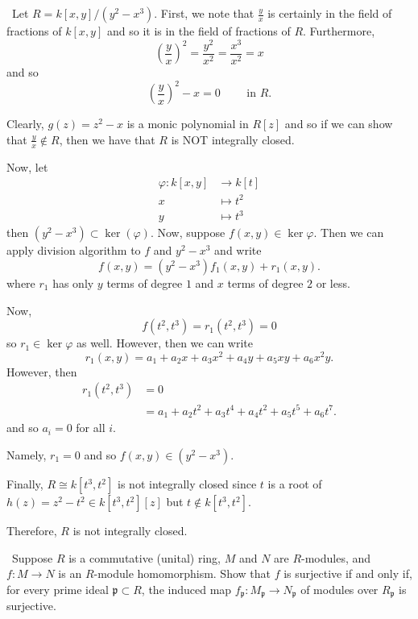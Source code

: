 \documentclass[12pt]{AlgebraQual}
\begin{document}
\begin{solution}$\,$
Let $R=k[x,y]/(y^2-x^3)$. First, we note that $\frac{y}{x}$ is certainly in the field of fractions of $k[x,y]$ and so it is in the field of fractions of $R$. Furthermore, $$\left(\frac{y}{x}\right)^2=\frac{y^2}{x^2}=\frac{x^3}{x^2}=x$$ and so $$\left(\frac{y}{x}\right)^2-x=0\qquad\text{ in }R.$$

Clearly, $g(z)=z^2-x$ is a monic polynomial in $R[z]$ and so if we can show that $\frac{y}{x}\notin R$, then we have that $R$ is NOT integrally closed.

Now, let \begin{align*}
    \varphi:k[x,y]&\to k[t]\\
    x&\mapsto t^2\\
    y&\mapsto t^3
\end{align*} then $(y^2-x^3)\subset \ker(\varphi)$. Now, suppose $f(x,y)\in\ker\varphi$. Then we can apply division algorithm to $f$ and $y^2-x^3$ and write $$f(x,y)=(y^2-x^3)f_1(x,y)+r_1(x,y).$$ where $r_1$ has only $y$ terms of degree $1$ and $x$ terms of degree $2$ or less.

Now, $$f(t^2,t^3)=r_1(t^2,t^3)=0$$ so $r_1\in\ker\varphi$ as well. However, then we can write $$r_1(x,y)=a_1+a_2x+a_3x^2+a_4y+a_5xy+a_6x^2y.$$ However, then \begin{align*}
    r_1(t^2,t^3)&=0\\
    &=a_1+a_2t^2+a_3t^4+a_4t^2+a_5t^5+a_6t^7.
\end{align*} and so $a_i=0$ for all $i$.

Namely, $r_1=0$ and so $f(x,y)\in(y^2-x^3).$

Finally, $R\cong k[t^3,t^2]$ is not integrally closed since $t$ is a root of $h(z)=z^2-t^2\in k[t^3,t^2][z]$ but $t\notin k[t^3,t^2]$.

Therefore, $R$ is not integrally closed.
\end{solution}
\newpage



\begin{problem} $\,$
Suppose $R$ is a commutative (unital) ring, $M$ and $N$ are $R$-modules, and $f:M\to N$ is an $R$-module homomorphism. Show that $f$ is surjective if and only if, for every prime ideal $\mathfrak{p}\subset R$, the induced map $f_\mathfrak{p}:M_\mathfrak{p}\to N_\mathfrak{p}$ of modules over $R_\mathfrak{p}$ is surjective.
\end{problem}
\end{document}

